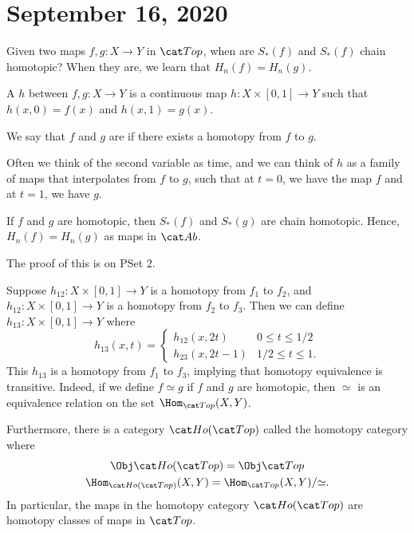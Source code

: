 \documentclass{standalone}
\begin{document}
\chapter{September 16, 2020}

\begin{question}
  Given two maps \(f, g \colon X \to Y\) in \(\cTop\), when are
  \(S_*(f)\) and \(S_*(f)\) chain homotopic?
  When they are, we learn that \(H_n(f) = H_n(g)\).
\end{question}

\begin{definition}
  A  \(h\) between \(f, g \colon X \to Y\) is a continuous map
  \(h \colon X \times [0, 1] \to Y\) such that \(h(x, 0) = f(x)\) and
  \(h(x, 1) = g(x)\).

  We say that \(f\) and \(g\) are  if there exists a homotopy
  from \(f\) to \(g\).
\end{definition}

Often we think of the second variable as time, and we can think of \(h\) as
a family of maps that interpolates from \(f\) to \(g\), such that at \(t = 0\),
we have the map \(f\) and at \(t = 1\), we have \(g\).

\begin{theorem}
  If \(f\) and \(g\) are homotopic, then \(S_*(f)\) and \(S_*(g)\) are
  chain homotopic. Hence, \(H_n(f) = H_n(g)\) as maps in \(\cAb\).
\end{theorem}
The proof of this is on PSet 2.

Suppose \(h_{12} \colon X \times [0, 1] \to Y\) is a homotopy
from \(f_1\) to \(f_2\), and \(h_{12} \colon X \times [0, 1] \to Y\)
is a homotopy from \(f_2\) to \(f_3\).
Then we can define \(h_{13} \colon X \times [0, 1] \to Y\) where
\[
  h_{13}(x, t) = \begin{cases}
    h_{12}(x, 2t) & 0 \leq t \leq 1/2 \\[-1ex]
    h_{23}(x, 2t-1) & 1/2 \leq t \leq 1.
  \end{cases}
\]
This \(h_{13}\) is a homotopy from \(f_1\) to \(f_3\), implying that homotopy
equivalence is transitive. Indeed, if we define \(f \simeq g\)
if \(f\) and \(g\) are homotopic, then \(\simeq\) is an equivalence relation
on the set \(\Hom_{\cTop}(X, Y)\).

Furthermore, there is a category \(\cHoTop\) called
the homotopy category where
\begin{gather*}
  \Obj \cHoTop = \Obj \cTop \\
  \Hom_{\cHoTop}(X, Y) = \Hom_{\cTop}(X, Y) / {\simeq}.
\end{gather*}
In particular, the maps in the homotopy category \(\cHoTop\) are
homotopy classes of maps in \(\cTop\).
\end{document}
